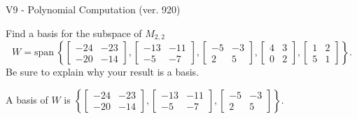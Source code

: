 \begin{exercise}
  \begin{exerciseTitle}V9 - Polynomial Computation (ver. 920)\end{exerciseTitle}
  \begin{exerciseStatement}
    Find a basis for the subspace of \(M_{2,2}\) 
\[W=\mathrm{span}\ \left\{\left[\begin{array}{cc}
-24 & -23 \\
-20 & -14
\end{array}\right] , \left[\begin{array}{cc}
-13 & -11 \\
-5 & -7
\end{array}\right] , \left[\begin{array}{cc}
-5 & -3 \\
2 & 5
\end{array}\right] , \left[\begin{array}{cc}
4 & 3 \\
0 & 2
\end{array}\right] , \left[\begin{array}{cc}
1 & 2 \\
5 & 1
\end{array}\right]\right\}.\]
 Be sure to explain why your result is a basis.


  \end{exerciseStatement}
  \begin{exerciseAnswer}
   A basis of \(W\) is  \(\left\{\left[\begin{array}{cc}
-24 & -23 \\
-20 & -14
\end{array}\right] , \left[\begin{array}{cc}
-13 & -11 \\
-5 & -7
\end{array}\right] , \left[\begin{array}{cc}
-5 & -3 \\
2 & 5
\end{array}\right]\right\}\).
  


  \end{exerciseAnswer}
\end{exercise}